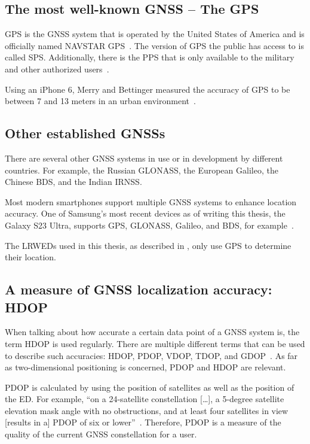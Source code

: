 \subsection{The most well-known \acl{GNSS} – The \acl{GPS}}

\ac{GPS} is the \ac{GNSS} system that is operated by the United States of America and is officially named NAVSTAR \ac{GPS}~\cite{department_of_defense_usa_gps_2020}.
The version of \ac{GPS} the public has access to is called \acf{SPS}.
Additionally, there is the \acf{PPS} that is only available to the military and other authorized users~\cite{department_of_defense_usa_gps_2007}.

Using an iPhone 6, Merry and Bettinger measured the accuracy of \ac{GPS} to be between 7 and 13 meters in an urban environment~\cite{merry_smartphone_2019}.

\subsection{Other established \aclp{GNSS}}

There are several other \ac{GNSS} systems in use or in development by different countries.
For example, the Russian GLONASS, the European Galileo, the Chinese \acf{BDS}, and the Indian \acf{IRNSS}.

Most modern smartphones support multiple \ac{GNSS} systems to enhance location accuracy.
One of Samsung's most recent devices as of writing this thesis, the Galaxy S23 Ultra, supports \ac{GPS}, GLONASS, Galileo, and \ac{BDS}, for example~\cite{gsmarena_samsung_2023}.

The \aclp{LRWED} used in this thesis, as described in , only use \ac{GPS} to determine their location.

\subsection{A measure of \acl{GNSS} localization accuracy: \acl{HDOP}}

When talking about how accurate a certain data point of a \ac{GNSS} system is, the term \ac{HDOP} is used regularly.
There are multiple different terms that can be used to describe such accuracies: \ac{HDOP}, \ac{PDOP}, \ac{VDOP}, \ac{TDOP}, and \ac{GDOP}~\cite{langley_dilution_1999}.
As far as two-dimensional positioning is concerned, \ac{PDOP} and \ac{HDOP} are relevant.

\ac{PDOP} is calculated by using the position of satellites as well as the position of the \acl{ED}.
For example, ``on a 24-satellite constellation […], a 5-degree satellite elevation mask angle with no obstructions, and at least four satellites in view [results in a] \acf{PDOP} of six or lower''~\cite{langley_dilution_1999}.
Therefore, \ac{PDOP} is a measure of the quality of the current \ac{GNSS} constellation for a user.

